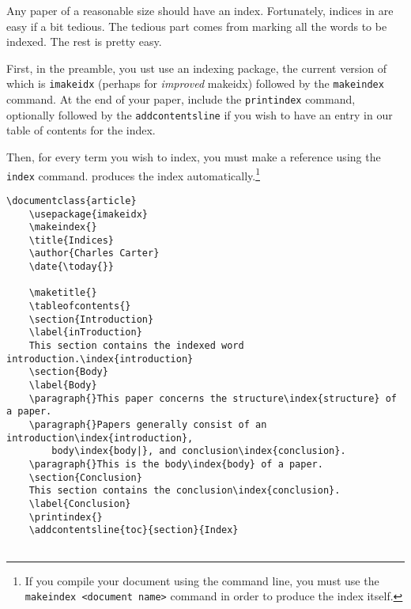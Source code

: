    Any paper of a reasonable size should have an index. Fortunately, indices in \LaTeXe{} are easy if a bit tedious. The tedious part comes from marking all the words to be indexed. The rest is pretty easy.

    First, in the preamble, you ust use an indexing package, the current version of which is \texttt{imakeidx} (perhaps for \textit{improved} makeidx) followed by the \texttt{makeindex} command. At the end of your paper, include the \texttt{printindex} command, optionally followed by the \texttt{addcontentsline} if you wish to have an entry in our table of contents for the index. 

    Then, for every term you wish to index, you must make a reference using the \texttt{index} command. \LaTeXe produces the index automatically.\footnote{If you compile your document using the command line, you must use the \texttt{makeindex <document name>} command in order to produce the index itself.}

        \begin{verbatim}
\documentclass{article}
    \usepackage{imakeidx}
    \makeindex{}
    \title{Indices}
    \author{Charles Carter}
    \date{\today{}}
 
    \maketitle{}
    \tableofcontents{}
    \section{Introduction}
    \label{inTroduction}
    This section contains the indexed word introduction.\index{introduction}
    \section{Body}
    \label{Body}
    \paragraph{}This paper concerns the structure\index{structure} of a paper.
    \paragraph{}Papers generally consist of an introduction\index{introduction}, 
        body\index{body|}, and conclusion\index{conclusion}.
    \paragraph{}This is the body\index{body} of a paper.
    \section{Conclusion}
    This section contains the conclusion\index{conclusion}.
    \label{Conclusion}
    \printindex{}
    \addcontentsline{toc}{section}{Index}
    
        \end{verbatim}

